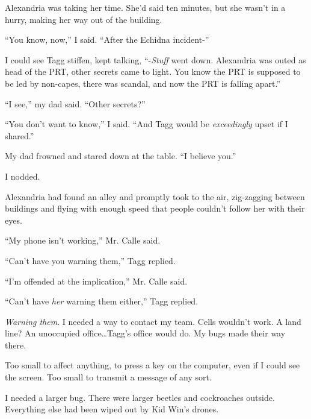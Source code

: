 Alexandria was taking her time.  She'd said ten minutes, but she wasn't in a hurry, making her way out of the building.



``You know, now,'' I said.  ``After the Echidna incident-''



I could see Tagg stiffen, kept talking, ``-\emph{Stuff} went down.  Alexandria was outed as head of the PRT, other secrets came to light.  You know the PRT is supposed to be led by non-capes, there was scandal, and now the PRT is falling apart.''



``I see,'' my dad said.  ``Other secrets?''



``You don't want to know,'' I said.  ``And Tagg would be \emph{exceedingly }upset if I shared.''



My dad frowned and stared down at the table.  ``I believe you.''



I nodded.



Alexandria had found an alley and promptly took to the air, zig-zagging between buildings and flying with enough speed that people couldn't follow her with their eyes.



``My phone isn't working,'' Mr. Calle said.



``Can't have you warning them,'' Tagg replied.



``I'm offended at the implication,'' Mr. Calle said.



``Can't have \emph{her} warning them either,'' Tagg replied.



\emph{Warning them}.  I needed a way to contact my team. Cells wouldn't work.  A land line?  An unoccupied office\ldots Tagg's office would do.  My bugs made their way there.



Too small to affect anything, to press a key on the computer, even if I could see the screen.  Too small to transmit a message of any sort.



I needed a larger bug.  There were larger beetles and cockroaches outside.  Everything else had been wiped out by Kid Win's drones.



